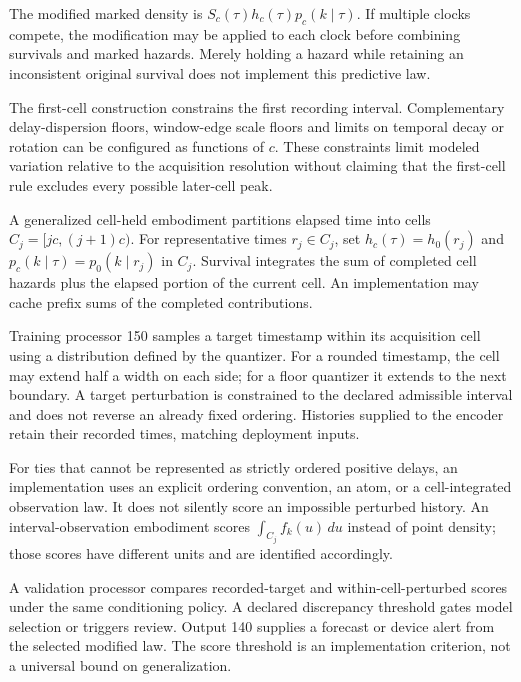 \documentclass[pct]{sm-patent}
\begin{document}
\pnum The modified marked density is $S_c(\tau)h_c(\tau)p_c(k\mid\tau)$. If multiple clocks compete, the modification may be applied to each clock before combining survivals and marked hazards. Merely holding a hazard while retaining an inconsistent original survival does not implement this predictive law.

\pnum The first-cell construction constrains the first recording interval. Complementary delay-dispersion floors, window-edge scale floors and limits on temporal decay or rotation can be configured as functions of $c$. These constraints limit modeled variation relative to the acquisition resolution without claiming that the first-cell rule excludes every possible later-cell peak.

\pnum A generalized cell-held embodiment partitions elapsed time into cells $C_j=[jc,(j+1)c)$. For representative times $r_j\in C_j$, set $h_c(\tau)=h_0(r_j)$ and $p_c(k\mid\tau)=p_0(k\mid r_j)$ in $C_j$. Survival integrates the sum of completed cell hazards plus the elapsed portion of the current cell. An implementation may cache prefix sums of the completed contributions.

\pnum Training processor 150 samples a target timestamp within its acquisition cell using a distribution defined by the quantizer. For a rounded timestamp, the cell may extend half a width on each side; for a floor quantizer it extends to the next boundary. A target perturbation is constrained to the declared admissible interval and does not reverse an already fixed ordering. Histories supplied to the encoder retain their recorded times, matching deployment inputs.

\pnum For ties that cannot be represented as strictly ordered positive delays, an implementation uses an explicit ordering convention, an atom, or a cell-integrated observation law. It does not silently score an impossible perturbed history. An interval-observation embodiment scores $\int_{C_j}f_k(u)\,du$ instead of point density; those scores have different units and are identified accordingly.

\pnum A validation processor compares recorded-target and within-cell-perturbed scores under the same conditioning policy. A declared discrepancy threshold gates model selection or triggers review. Output 140 supplies a forecast or device alert from the selected modified law. The score threshold is an implementation criterion, not a universal bound on generalization.

\end{document}
